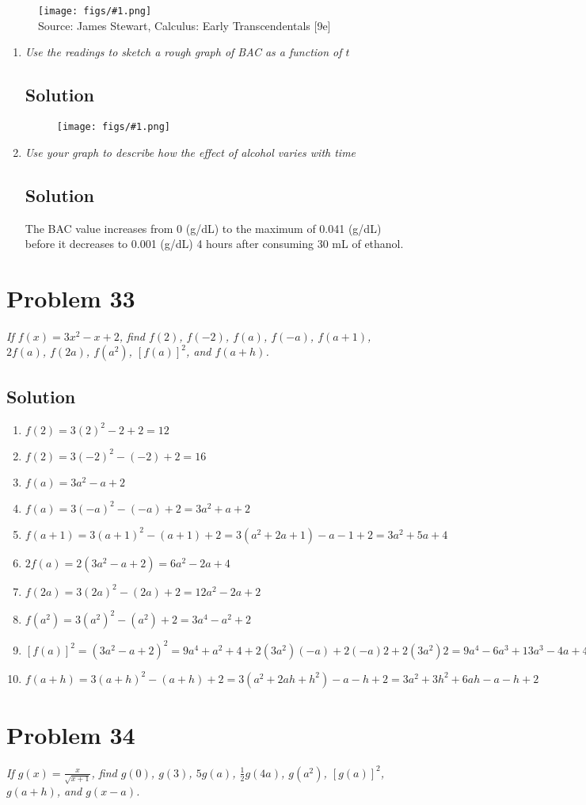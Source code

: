 \documentclass[11pt]{article}
\newcommand{\soln}{\subsection*}
\newcommand{\qn}{\textit}
\newcommand{\imagesource}[1]{{\footnotesize Source: #1}}
\newcommand{\imgqn}[1]{
	\begin{figure}[H]
		\centering
		\texttt{[image: figs/\#1.png]}\\
		\imagesource{James Stewart, Calculus: Early Transcendentals [9e]}
	\end{figure}
}
\newcommand{\imgsoln}[1]{
	\begin{figure}[H]
		\centering
		\texttt{[image: figs/\#1.png]}
	\end{figure}
}
\begin{document}
\imgqn{1.1.32}

\begin{enumerate}
	\item \qn{Use the readings to sketch a rough graph of BAC as a function of $t$}
	\soln{Solution}
	\imgsoln{1.1.32-ans.a}
	
	\item \qn{Use your graph to describe how the effect of alcohol varies with time}
	\soln{Solution}
	The BAC value increases from 0 (g/dL) to the maximum of 0.041 (g/dL) before it decreases to 0.001 (g/dL) 4 hours after consuming 30 mL of ethanol.
\end{enumerate}

\section*{Problem 33}

\qn{If $f(x)=3x^2-x+2$, find $f(2)$, $f(-2)$, $f(a)$, $f(-a)$, $f(a+1)$, $2f(a)$, $f(2a)$, $f(a^2)$, $[f(a)]^2$, and $f(a+h)$.}

\soln{Solution}
\begin{enumerate}
	\item $f(2)=3(2)^2-2+2=12$
	\item $f(2)=3(-2)^2-(-2)+2=16$
	\item $f(a)=3a^2-a+2$
	\item $f(a)=3(-a)^2-(-a)+2=3a^2+a+2$
	\item $f(a+1)=3(a+1)^2-(a+1)+2=3(a^2+2a+1)-a-1+2=3a^2+5a+4$
	\item $2f(a)=2(3a^2-a+2)=6a^2-2a+4$
	\item $f(2a)=3(2a)^2-(2a)+2=12a^2-2a+2$
	\item $f(a^2)=3(a^2)^2-(a^2)+2=3a^4-a^2+2$
	\item $[f(a)]^2=(3a^2-a+2)^2=9a^4+a^2+4+2(3a^2)(-a)+2(-a)2+2(3a^2)2=9a^4-6a^3+13a^3-4a+4$
	\item $f(a+h)=3(a+h)^2-(a+h)+2=3(a^2+2ah+h^2)-a-h+2=3a^2+3h^2+6ah-a-h+2$
\end{enumerate}

\section*{Problem 34}

\qn{If $g(x)=\frac{x}{\sqrt{x+1}}$, find $g(0)$, $g(3)$, $5g(a)$, $\frac{1}{2}g(4a)$, $g(a^2)$, $[g(a)]^2$, $g(a+h)$, and $g(x-a)$.}
\end{document}
